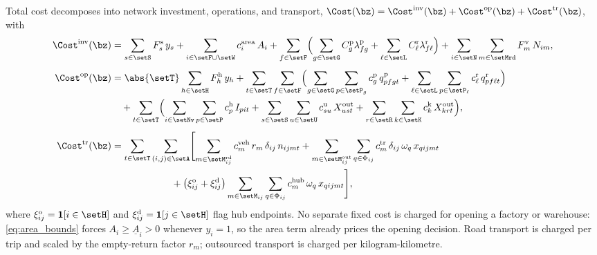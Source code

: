 Total cost decomposes into network investment, operations, and
transport, $\Cost(\bz)=\Cost^{\mathrm{inv}}(\bz)+
\Cost^{\mathrm{op}}(\bz)+\Cost^{\mathrm{tr}}(\bz)$, with
\begin{align}
\Cost^{\mathrm{inv}}(\bz)
&=\sum_{s\in\setS}F^{\mathrm{s}}_s\,y_s
 +\sum_{i\in\setF\cup\setW}c^{\mathrm{area}}_i\,A_i
 +\sum_{f\in\setF}\Bigl(\sum_{g\in\setG}C^{\mathrm{p}}_g\lambda^{\mathrm{p}}_{fg}
  +\sum_{\ell\in\setL}C^{\mathrm{r}}_{\ell}\lambda^{\mathrm{r}}_{f\ell}\Bigr)
 +\sum_{i\in\setN}\sum_{m\in\setMrd}F^{\mathrm{v}}_m\,N_{im},
\label{eq:cost_inv}\\[0.4em]
\Cost^{\mathrm{op}}(\bz)
&=\abs{\setT}\sum_{h\in\setH}F^{\mathrm{h}}_h\,y_h
 +\sum_{t\in\setT}\sum_{f\in\setF}\Bigl(
   \sum_{g\in\setG}\sum_{p\in\setP_g}c^{\mathrm{p}}_g\,q^{\mathrm{p}}_{pfgt}
  +\sum_{\ell\in\setL}\sum_{p\in\setP_{\ell}}c^{\mathrm{r}}_{\ell}\,q^{\mathrm{r}}_{pf\ell t}\Bigr)
\nonumber\\
&\quad
 +\sum_{t\in\setT}\Bigl(
   \sum_{i\in\setNv}\sum_{p\in\setP}c^{\mathrm{h}}_p\,I_{pit}
  +\sum_{s\in\setS}\sum_{u\in\setU}c^{\mathrm{u}}_{su}\,X^{\mathrm{out}}_{ust}
  +\sum_{r\in\setR}\sum_{k\in\setK}c^{\mathrm{k}}_k\,X^{\mathrm{out}}_{krt}\Bigr),
\label{eq:cost_op}\\[0.4em]
\Cost^{\mathrm{tr}}(\bz)
&=\sum_{t\in\setT}\sum_{(i,j)\in\setA}\Biggl[
   \sum_{m\in\Mrdij}c^{\mathrm{veh}}_m\,r_m\,\delta_{ij}\,n_{ijmt}
  +\sum_{m\in\Moutij}\sum_{q\in\Phi_{ij}}c^{\mathrm{tr}}_m\,\delta_{ij}\,\omega_q\,x_{qijmt}
\nonumber\\
&\hspace{6.2em}
  +\bigl(\xi^{\mathrm{o}}_{ij}+\xi^{\mathrm{d}}_{ij}\bigr)
   \sum_{m\in\setM_{ij}}\sum_{q\in\Phi_{ij}}c^{\mathrm{hub}}_m\,\omega_q\,x_{qijmt}\Biggr],
\label{eq:cost_tr}
\end{align}
where $\xi^{\mathrm{o}}_{ij}=\mathbf{1}[i\in\setH]$ and
$\xi^{\mathrm{d}}_{ij}=\mathbf{1}[j\in\setH]$ flag hub endpoints. No
separate fixed cost is charged for opening a factory or warehouse:
\eqref{eq:area_bounds} forces $A_i\ge\underline{A}_i>0$ whenever
$y_i=1$, so the area term already prices the opening decision. Road
transport is charged per trip and scaled by the empty-return factor
$r_m$; outsourced transport is charged per kilogram-kilometre.

